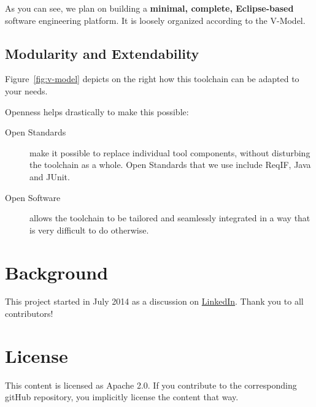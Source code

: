 As you can see, we plan on building a \textbf{minimal, complete, Eclipse-based} software engineering platform.  It is loosely organized according to the V-Model.

\subsection{Modularity and Extendability}

Figure~\ref{fig:v-model} depicts on the right how this toolchain can be adapted to your needs.


Openness helps drastically to make this possible:

\begin{description}
\item[Open Standards] make it possible to replace individual tool components, without disturbing the toolchain as a whole.  Open Standards that we use include ReqIF, Java and JUnit.
\item[Open Software] allows the toolchain to be tailored and seamlessly integrated in a way that is very difficult to do otherwise.
\end{description}

\section{Background}

This project started in July 2014 as a discussion on \href{https://www.linkedin.com/groupItem?commentID=-1&item=5890782095432781827&type=member&gid=128312&view=}{LinkedIn}.  Thank you to all contributors!

\section{License}

This content is licensed as Apache 2.0.  If you contribute to the corresponding gitHub repository, you implicitly license the content that way.


